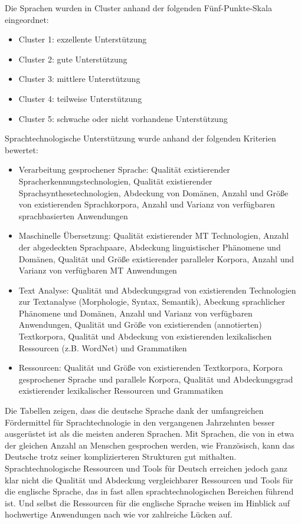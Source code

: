 \documentclass[]{../../metanetpaper}
\begin{document}
\begin{Parallel}[c]{79mm}{78mm}
{Die Sprachen wurden in Cluster anhand der folgenden Fünf-Punkte-Skala eingeordnet:
\begin{itemize}
\item Cluster 1: exzellente Unterstützung
\item Cluster 2: gute Unterstützung
\item Cluster 3: mittlere Unterstützung
\item Cluster 4: teilweise Unterstützung
\item Cluster 5: schwache oder nicht vorhandene Unterstützung
\end{itemize}
Sprachtechnologische Unterstützung wurde anhand der folgenden Kriterien bewertet:
\begin{itemize}
\item Verarbeitung gesprochener Sprache: Qualität existierender Spracherkennungstechnologien, Qualität existierender Sprachsynthesetechnologien, Abdeckung von Domänen, Anzahl und Größe von existierenden Sprachkorpora, Anzahl und Varianz von verfügbaren sprachbasierten Anwendungen
\item Maschinelle Übersetzung: Qualität existierender MT Technologien, Anzahl der abgedeckten Sprachpaare, Abdeckung linguistischer Phänomene und Domänen, Qualität und Größe existierender paralleler Korpora, Anzahl und Varianz von verfügbaren MT Anwendungen
\item Text Analyse: Qualität und Abdeckungsgrad von existierenden Technologien zur Textanalyse (Morphologie, Syntax, Semantik), Abeckung sprachlicher Phänomene und Domänen, Anzahl und Varianz von verfügbaren Anwendungen, Qualität und Größe von existierenden (annotierten) Textkorpora, Qualität und Abdeckung von existierenden lexikalischen Ressourcen (z.B. WordNet) und Grammatiken
\item Ressourcen: Qualität und Größe von existierenden Textkorpora, Korpora gesprochener Sprache und parallele Korpora, Qualität und Abdeckungsgrad existierender lexikalischer Ressourcen und Grammatiken
\end{itemize} 
Die Tabellen zeigen, dass die deutsche Sprache dank der umfangreichen Fördermittel für Sprachtechnologie in den vergangenen Jahrzehnten besser ausgerüstet ist als die meisten anderen Sprachen. Mit Sprachen, die von in etwa der gleichen Anzahl an Menschen gesprochen werden, wie Französisch, kann das Deutsche trotz seiner komplizierteren Strukturen gut mithalten. Sprachtechnologische Ressourcen und Tools für Deutsch erreichen jedoch ganz klar nicht die Qualität und Abdeckung vergleichbarer Ressourcen und Tools für die englische Sprache, das in fast allen sprachtechnologischen Bereichen führend ist. Und selbst die Ressourcen für die englische Sprache weisen im Hinblick auf hochwertige Anwendungen nach wie vor zahlreiche Lücken auf.

}
\end{Parallel}
\end{document}
